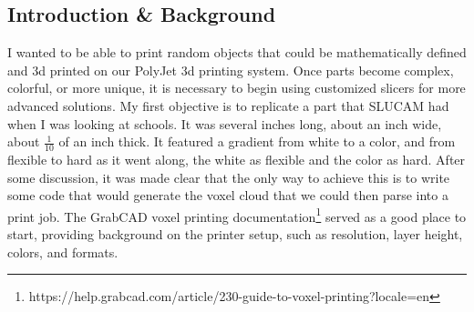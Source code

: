 \documentclass{article}
\begin{document}
\begin{multicols}{2}
\section{Introduction \& Background}
I wanted to be able to print random objects that could be mathematically defined and 3d printed on our PolyJet 3d printing system. Once parts become complex, colorful, or more unique, it is necessary to begin using customized slicers for more advanced solutions. My first objective is to replicate a part that SLUCAM had when I was looking at schools. It was several inches long, about an inch wide, about $\frac{1}{10}$ of an inch thick. It featured a gradient from white to a color, and from flexible to hard as it went along, the white as flexible and the color as hard. After some discussion, it was made clear that the only way to achieve this is to write some code that would generate the voxel cloud that we could then parse into a print job. The GrabCAD voxel printing documentation\footnote{https://help.grabcad.com/article/230-guide-to-voxel-printing?locale=en} served as a good place to start, providing background on the printer setup, such as resolution, layer height, colors, and formats. 


\end{multicols}
\end{document}
